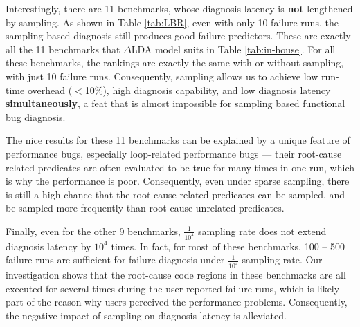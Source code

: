 Interestingly, there are 11 benchmarks, whose diagnosis latency is \textbf{not}
lengthened by sampling. As shown in Table \ref{tab:LBR}, even with only
10 failure runs, the sampling-based diagnosis still produces good failure
predictors. These are exactly all the 11 benchmarks that $\Delta$LDA model 
suits in Table \ref{tab:in-house}. 
For all these benchmarks,
the rankings are exactly the same with or without
sampling, with just 10 failure runs. Consequently, sampling
allows us to achieve low run-time overhead ($<$10\%), high diagnosis capability,
and low diagnosis latency \textbf{simultaneously}, a feat that is almost 
impossible
for sampling based functional bug diagnosis.

The nice results for these 11 benchmarks can be explained by a unique feature
of performance bugs, especially loop-related
performance bugs --- their root-cause related predicates are often evaluated to 
be true for many times in one run, which is why the performance is poor.
Consequently, even under sparse sampling, there is still a high chance that the
root-cause related predicates can be sampled, and be sampled more frequently
than root-cause unrelated predicates.


Finally, even for the other 9 benchmarks, 
$\frac{1}{10^4}$ sampling rate does not 
extend diagnosis
latency by $10^4$ times. In fact, for most of these benchmarks, 100 -- 500
failure runs are sufficient for failure diagnosis under 
$\frac{1}{10^4}$ sampling
rate. Our investigation shows that the root-cause code regions in these 
benchmarks
are all executed for several times during the user-reported failure runs, 
which
is likely part of the reason why users perceived the performance problems. 
Consequently, the negative impact of sampling on diagnosis latency is
alleviated.


